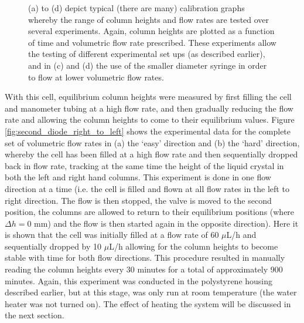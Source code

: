 \begin{figure}
\begin{center}
\end{center}
\caption[Calibration graphs for the second diode cell]{\label{fig:second_diode_small_graphs} (a) to (d) depict typical (there are many) calibration graphs whereby the range of column heights and flow rates are tested over several experiments. Again, column heights are plotted as a function of time and volumetric flow rate prescribed. These experiments allow the testing of different experimental set ups (as described earlier), and in (c) and (d) the use of the smaller diameter syringe in order to flow at lower volumetric flow rates.}
\end{figure}

With this cell, equilibrium column heights were measured by first filling the cell and manometer tubing at a high flow rate, and then gradually reducing the flow rate and allowing the column heights to come to their equilibrium values. Figure \ref{fig:second_diode_right_to_left} shows the experimental data for the complete set of volumetric flow rates in (a) the `easy' direction and (b) the `hard' direction, whereby the cell has been filled at a high flow rate and then sequentially dropped back in flow rate, tracking at the same time the height of the liquid crystal in both the left and right hand columns. This experiment is done in one flow direction at a time (i.e. the cell is filled and flown at all flow rates in the left to right direction. The flow is then stopped, the valve is moved to the second position, the columns are allowed to return to their equilibrium positions (where $\Delta h=0$ mm) and the flow is then started again in the opposite direction). Here it is shown that the cell was initially filled at a flow rate of 60 $\mu$L/h and sequentially dropped by 10 $\mu$L/h allowing for the column heights to become stable with time for both flow directions. This procedure resulted in manually reading the column heights every 30 minutes for a total of approximately 900 minutes. Again, this experiment was conducted in the polystyrene housing described earlier, but at this stage, was only run at room temperature (the water heater was not turned on). The effect of heating the system will be discussed in the next section. 

